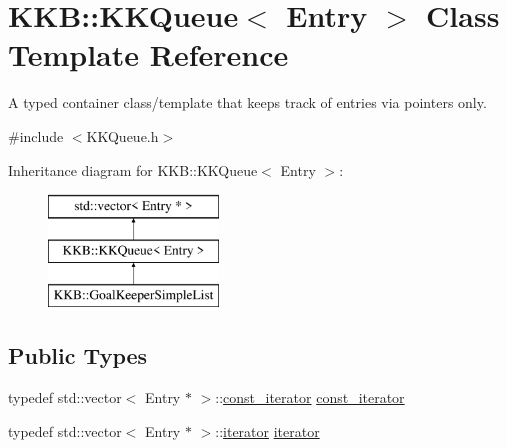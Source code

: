 \hypertarget{class_k_k_b_1_1_k_k_queue}{}\section{K\+KB\+:\+:K\+K\+Queue$<$ Entry $>$ Class Template Reference}
\label{class_k_k_b_1_1_k_k_queue}


A typed container class/template that keeps track of entries via pointers only.  




{\ttfamily \#include $<$K\+K\+Queue.\+h$>$}

Inheritance diagram for K\+KB\+:\+:K\+K\+Queue$<$ Entry $>$\+:\begin{figure}[H]
\begin{center}
\leavevmode
\includegraphics[height=3.000000cm]{class_k_k_b_1_1_k_k_queue}
\end{center}
\end{figure}
\subsection*{Public Types}
\begin{DoxyCompactItemize}
\item 
typedef std\+::vector$<$ Entry $\ast$ $>$\+::\hyperlink{class_k_k_b_1_1_k_k_queue_aeb057c9c010446f46f57c1e355f981f1}{const\+\_\+iterator} \hyperlink{class_k_k_b_1_1_k_k_queue_aeb057c9c010446f46f57c1e355f981f1}{const\+\_\+iterator}
\item 
typedef std\+::vector$<$ Entry $\ast$ $>$\+::\hyperlink{class_k_k_b_1_1_k_k_queue_aa3c2796a726eea468b94132a9fbf2cfe}{iterator} \hyperlink{class_k_k_b_1_1_k_k_queue_aa3c2796a726eea468b94132a9fbf2cfe}{iterator}
\end{DoxyCompactItemize}
